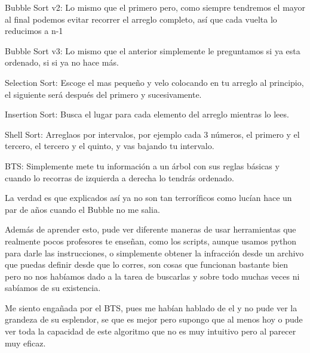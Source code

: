 \documentclass[12pt, fleqn]{report}                             %
\theoremstyle{break}                                            %
\begin{document}
	    	Bubble Sort v2: Lo mismo que el primero pero, como siempre tendremos el mayor al final podemos evitar recorrer el arreglo completo, así que cada vuelta lo reducimos a n-1
	    	
	    	Bubble Sort v3: Lo mismo que el anterior simplemente le preguntamos si ya esta ordenado, si si ya no hace más.
	    	
	    	Selection Sort: Escoge el mas pequeño y velo colocando en tu arreglo al principio, el siguiente será después del primero y sucesivamente.
	    	
	    	Insertion Sort: Busca el lugar para cada elemento del arreglo mientras lo lees.
	    	
	    	Shell Sort: Arreglaos por intervalos, por ejemplo cada 3 números, el primero y el tercero, el tercero y el quinto, y vas bajando tu intervalo.
	    	
	    	BTS: Simplemente mete tu información a un árbol con sus reglas básicas y cuando lo recorras de izquierda a derecha lo tendrás ordenado.
	    	
	    	La verdad es que explicados así ya no son tan terroríficos como lucían hace un par de años cuando el Bubble no me salia.
	    	
	    	Además de aprender esto, pude ver diferente maneras de usar herramientas que realmente pocos profesores te enseñan, como los scripts, aunque usamos python para darle las instrucciones, o simplemente obtener la infracción desde un archivo que puedas definir desde que lo corres, son cosas que funcionan bastante bien pero no nos habíamos dado a la tarea de buscarlas y sobre todo muchas veces ni sabíamos de su existencia.
	    	
	    	Me siento engañada por el BTS, pues me habían hablado de el y no pude ver la grandeza de su esplendor, se que es mejor pero supongo que al menos hoy o pude ver toda la capacidad de este algoritmo que no es muy intuitivo pero al parecer muy eficaz.
	    	
	    	
	    	
	    	
	\clearpage
	
\end{document}
